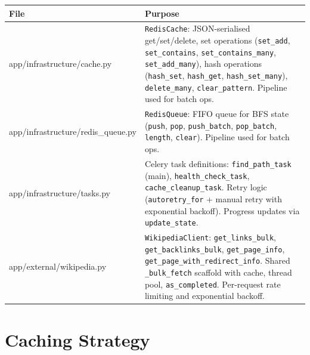 \documentclass[11pt,a4paper]{article}
\begin{document}
\begin{tabularx}{\textwidth}{@{}>{\ttfamily}l X@{}}
\toprule
\normalfont\textbf{File} & \textbf{Purpose} \\
\midrule
app/infrastructure/cache.py & \texttt{RedisCache}: JSON-serialised get/set/delete, set operations (\texttt{set\_add}, \texttt{set\_contains}, \texttt{set\_contains\_many}, \texttt{set\_add\_many}), hash operations (\texttt{hash\_set}, \texttt{hash\_get}, \texttt{hash\_set\_many}), \texttt{delete\_many}, \texttt{clear\_pattern}. Pipeline used for batch ops. \\
\addlinespace[0.3em]
app/infrastructure/redis\_queue.py & \texttt{RedisQueue}: FIFO queue for BFS state (\texttt{push}, \texttt{pop}, \texttt{push\_batch}, \texttt{pop\_batch}, \texttt{length}, \texttt{clear}). Pipeline used for batch ops. \\
\addlinespace[0.3em]
app/infrastructure/tasks.py & Celery task definitions: \texttt{find\_path\_task} (main), \texttt{health\_check\_task}, \texttt{cache\_cleanup\_task}. Retry logic (\texttt{autoretry\_for} + manual retry with exponential backoff). Progress updates via \texttt{update\_state}. \\
\addlinespace[0.3em]
app/external/wikipedia.py & \texttt{WikipediaClient}: \texttt{get\_links\_bulk}, \texttt{get\_backlinks\_bulk}, \texttt{get\_page\_info}, \texttt{get\_page\_with\_redirect\_info}. Shared \texttt{\_bulk\_fetch} scaffold with cache, thread pool, \texttt{as\_completed}. Per-request rate limiting and exponential backoff. \\
\bottomrule
\end{tabularx}

\section{Caching Strategy}
\end{document}
